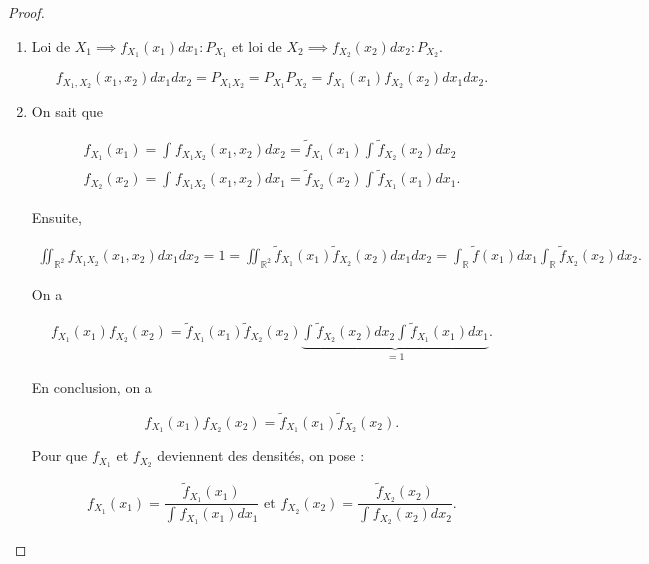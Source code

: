 \documentclass[french]{book}
\theoremstyle{definition}
\theoremstyle{remark}
\begin{document}

\begin{proof}

  \

  \begin{enumerate}
    \item Loi de \(X_1 \implies f _{X_1}(x_1) d x_1 : P _{X_1}\) et loi de \(X_2 \implies f _{X_2} (x_2) d x_2 : P _{X_2}\).

    \[f _{X_1, X_2}(x_1, x_2)dx_1dx_2 = P _{X_1 X_2} = P _{X_1} P _{X_2} = f _{X_1}(x_1) f _{X_2}(x_2) dx_1dx_2.\]

    \item On sait que

    \begin{gather*}
      f _{X_1}(x_1) = \int_{}^{} f _{X_1 X_2}(x_1, x_2) d x_2 = \tilde{f} _{X_1}(x_1) \int_{}^{} \tilde{f} _{X_2} (x_2) d x_2  \\
      f _{X_2}(x_2) = \int_{}^{} f _{X_1 X_2} (x_1, x_2) d x_1 = \tilde{f} _{X_2}(x_2) \int_{}^{} \tilde{f} _{X_1}(x_1) d x_1.
    \end{gather*}

    Ensuite,

    \begin{gather*}
      \iint_{\mathbb{R}^2} f _{X_1 X_2}(x_1, x_2) dx_1dx_2 = 1 = \iint_{\mathbb{R}^2} \tilde{f} _{X_1}(x_1) \tilde{f} _{X_2}(x_2) dx_1dx_2 = \int_{\mathbb{R}}^{} \tilde{f}(x_1) dx_1 \int_{\mathbb{R}}^{} \tilde{f}_{X_2}(x_2) dx_2.
    \end{gather*}

    On a

    \begin{gather*}
      f _{X_1}(x_1) f _{X_2}(x_2) = \tilde{f}_{X_1}(x_1) \tilde{f} _{X_2}(x_2) \underbrace{\int_{}^{} \tilde{f} _{X_2}(x_2) d x_2 \int_{}^{} \tilde{f}_{X_1} (x_1) d x_1}_{=1}.
    \end{gather*}

    En conclusion, on a

    \[ f _{X_1}(x_1) f _{X_2}(x_2) = \tilde{f} _{X_1}(x_1) \tilde{f} _{X_2}(x_2).\]

    Pour que $f _{X_1}$ et $f _{X_2}$ deviennent des densités, on pose :

    \[f _{X_1}(x_1) = \frac{\tilde{f} _{X_1}(x_1)}{\int_{}^{}f _{X_1}(x_1) d x_1 } \text{ et } f _{X_2}(x_2) = \frac{\tilde{f} _{X_2}(x_2)}{\int_{}^{}f _{X_2}(x_2) d x_2 }. \]
  \end{enumerate}
\end{proof}
\end{document}
